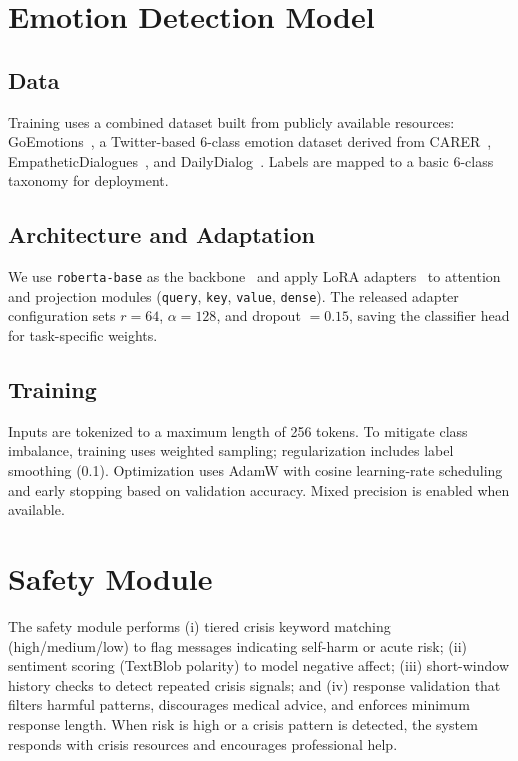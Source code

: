 \documentclass[conference]{IEEEtran}
\begin{document}
\section{Emotion Detection Model}
\subsection{Data}
Training uses a combined dataset built from publicly available resources: GoEmotions~\cite{demszky2020goemotions}, a Twitter-based 6-class emotion dataset derived from CARER~\cite{saravia-etal-2018-carer}, EmpatheticDialogues~\cite{rashkin-etal-2019-towards}, and DailyDialog~\cite{li2017dailydialog}. Labels are mapped to a basic 6-class taxonomy for deployment.

\subsection{Architecture and Adaptation}
We use \texttt{roberta-base} as the backbone~\cite{liu2019roberta} and apply LoRA adapters~\cite{hu2021lora} to attention and projection modules (\texttt{query}, \texttt{key}, \texttt{value}, \texttt{dense}). The released adapter configuration sets \(r=64\), \(\alpha=128\), and dropout \(=0.15\), saving the classifier head for task-specific weights.

\subsection{Training}
Inputs are tokenized to a maximum length of 256 tokens. To mitigate class imbalance, training uses weighted sampling; regularization includes label smoothing (0.1). Optimization uses AdamW with cosine learning-rate scheduling and early stopping based on validation accuracy. Mixed precision is enabled when available.

\section{Safety Module}
The safety module performs (i) tiered crisis keyword matching (high/medium/low) to flag messages indicating self-harm or acute risk; (ii) sentiment scoring (TextBlob polarity) to model negative affect; (iii) short-window history checks to detect repeated crisis signals; and (iv) response validation that filters harmful patterns, discourages medical advice, and enforces minimum response length. When risk is high or a crisis pattern is detected, the system responds with crisis resources and encourages professional help.
\end{document}
